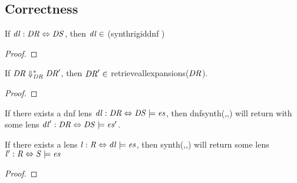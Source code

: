 \subsection{Correctness}

\begin{theorem}
If $\mathit{dl} : \mathit{DR} \Leftrightarrow \mathit{DS}$, then
$\mathit{dl} \in$ (synthrigiddnf \DNFRegex{} \DNFRegexAlt{})
\end{theorem}
\begin{proof}
\end{proof}

\begin{lemma}
If $\mathit{DR} \Downarrow_{\mathit{DR}}^* \mathit{DR}'$, then
$\mathit{DR}'\in$ retrieveallexpansions($\mathit{DR}$).
\end{lemma}
\begin{proof}
\end{proof}

\begin{theorem}
If there exists a dnf lens
$\mathit{dl} : \mathit{DR} \Leftrightarrow \mathit{DS} \models \mathit{es}$,
then dnfsynth(\DNFRegex{},\DNFRegexAlt{},\Examples{}) will return with some lens
$\mathit{dl}' : \mathit{DR} \Leftrightarrow \mathit{DS} \models \mathit{es}'$.
\end{theorem}

\begin{theorem}
If there exists a lens
$\mathit{l} : \mathit{R} \Leftrightarrow \mathit{dl} \models \mathit{es}$,
then synth(\DNFRegex{},\DNFRegexAlt{},\Examples{}) will return some lens
$\mathit{l}' : \mathit{R} \Leftrightarrow \mathit{S} \models \mathit{es}$
\end{theorem}
\begin{proof}
\end{proof}
